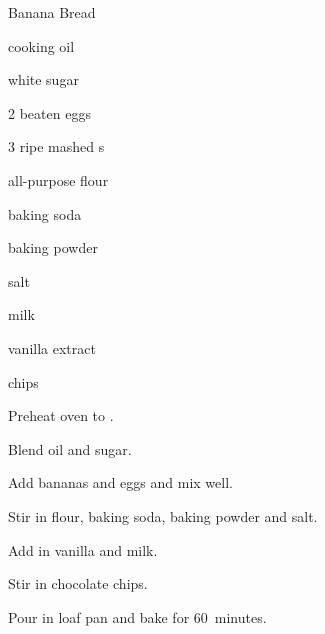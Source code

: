 \begin{recipe}{Banana Bread}{}{}

\begin{ingredients}
\item \C{\half} cooking oil
\item {} white sugar
\item 2 beaten eggs
\item 3 ripe mashed s
\item {} all-purpose flour
\item {} baking soda
\item \tp{\half} baking powder
\item \tp{\half} salt
\item {} milk
\item \tp{\half} vanilla extract
\item {}  chips
\end{ingredients}

\begin{directions}
\item Preheat oven to .
\item Blend oil and sugar.
\item Add bananas and eggs and mix well.
\item Stir in flour, baking soda, baking powder and salt.
\item Add in vanilla and milk.
\item Stir in chocolate chips.
\item Pour in loaf pan and bake for 60~minutes.
\end{directions}

\end{recipe}
